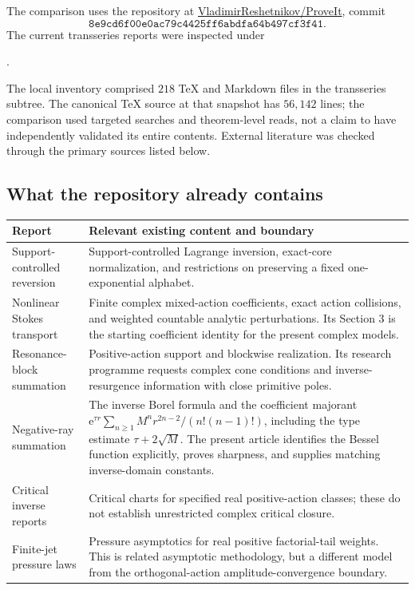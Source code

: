 \documentclass[11pt,a4paper]{article}
\numberwithin{equation}{section}
\theoremstyle{definition}
\theoremstyle{remark}
\newcommand{\e}{\mathrm e}
\begin{document}
The comparison uses the repository at
\href{https://github.com/VladimirReshetnikov/ProveIt}{VladimirReshetnikov/ProveIt},
commit
\[
 \texttt{8e9cd6f00e0ac79c4425ff6abdfa64b497cf3f41}.
\]
The current transseries reports were inspected under
\begin{center}
\small{}.
\end{center}
The local inventory comprised $218$ TeX and Markdown files in
the transseries subtree.
The canonical TeX source at that snapshot has $56{,}142$ lines;
the comparison used targeted searches and theorem-level reads,
not a claim to have independently validated its entire contents.
External literature was checked through the primary sources
listed below.

\subsection{What the repository already contains}

\begin{longtable}{@{}>{\raggedright\arraybackslash}p{}>{\raggedright\arraybackslash}p{}@{}}
\toprule
Report & Relevant existing content and boundary\\
\midrule
\endhead
Support-controlled reversion \cite{repo-support}
& Support-controlled Lagrange inversion, exact-core normalization,
and restrictions on preserving a fixed one-exponential alphabet.\\[4pt]
Nonlinear Stokes transport \cite{repo-stokes}
& Finite complex mixed-action coefficients, exact action collisions,
and weighted countable analytic perturbations. Its Section 3 is
the starting coefficient identity for the present complex models.\\[4pt]
Resonance-block summation \cite{repo-resonance}
& Positive-action support and blockwise realization.
Its research programme requests complex cone conditions and
inverse-resurgence information with close primitive poles.\\[4pt]
Negative-ray summation \cite{repo-negative}
& The inverse Borel formula and the coefficient majorant
$\e^{\tau r}\sum_{n\ge1}M^n r^{2n-2}/(n!(n-1)!)$,
including the type estimate $\tau+2\sqrt M$.
The present article identifies the Bessel function explicitly,
proves sharpness, and supplies matching inverse-domain constants.\\[4pt]
Critical inverse reports \cite{repo-moving,repo-critical}
& Critical charts for specified real positive-action classes;
these do not establish unrestricted complex critical closure.\\[4pt]
Finite-jet pressure laws \cite{repo-pressure}
& Pressure asymptotics for real positive factorial-tail weights.
This is related asymptotic methodology, but a different model from
the orthogonal-action amplitude-convergence boundary.\\
\bottomrule
\end{longtable}
\end{document}
